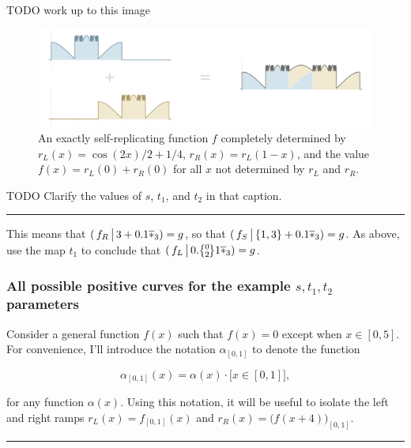 \documentclass[]{article}
\begin{document}
TODO work up to this image

\begin{figure}[htbp]
\centering
\includegraphics{images/pdfs/nonplateau.pdf}
\caption{\label{fig:nonplateau}An exactly self-replicating function
\(f\) completely determined by \(r_L(x) = \cos(2x)/2 + 1/4\),
\(r_R(x) = r_L(1 - x)\), and the value \(f(x) = r_L(0) + r_R(0)\) for
all \(x\) not determined by \(r_L\) and \(r_R\).}\label{fig:nonplateau}
\end{figure}

TODO Clarify the values of \(s\), \(t_1\), and \(t_2\) in that caption.

\begin{center}\rule{0.5\linewidth}{\linethickness}\end{center}

This means that \((\,f_R \,\big|\, 3 + 0.1\overline{*}_3) = g\), so that
\((\,f_S \,\big|\, \{1,3\} + 0.1\overline{*}_3) = g\). As above, use the map
\(t_1\) to conclude that \((\,f_L \restrict 0.\zerotwo 1\lstar) = g\).

\subsubsection{\texorpdfstring{All possible positive curves for the
example \(s,t_1,t_2\)
parameters}{All possible positive curves for the example s,t\_1,t\_2 parameters}}\label{all-possible-positive-curves-for-the-example-stux5f1tux5f2-parameters}

Consider a general function \(f(x)\) such that \(f(x)=0\) except when
\(x \in [0, 5]\). For convenience, I'll introduce the notation
\(\alpha_{[0,1]}\) to denote the function

\[\alpha_{[0,1]}(x) = \alpha(x) \cdot \big[ x\in [0,1] \big],\]

for any function \(\alpha(x)\). Using this notation, it will be useful
to isolate the left and right ramps \(r_L(x) = f_{[0,1]}(x)\) and
\(r_R(x) = \big(f(x + 4)\big)_{[0,1]}\).

\begin{center}\rule{0.5\linewidth}{\linethickness}\end{center}
\end{document}
